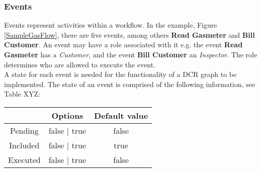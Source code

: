 \subsubsection{Events}
Events represent activities within a workflow. In the example, Figure \ref{SampleGasFlow}, there are five events, among others \textbf{Read Gasmeter} and \textbf{Bill Customer}. An event may have a role associated with it e.g. the event \textbf{Read Gasmeter} has a \textit{Customer}, and the event \textbf{Bill Customer} an \textit{Inspector}. The role determines who are allowed to execute the event. \\

A state for each event is needed for the functionality of a DCR graph to be implemented. The state of an event is comprised of the following information, see Table XYZ: \\
\begin{table}
\centering
\begin{tabular}{|c|c|c|}\hline 
 & Options & Default value \\ \hline 
Pending & false $\vert$ true & false \\ \hline 
Included & false $\vert$ true & true \\ \hline
Executed & false $\vert$ true & false \\ \hline

\end{tabular} 

\end{table}